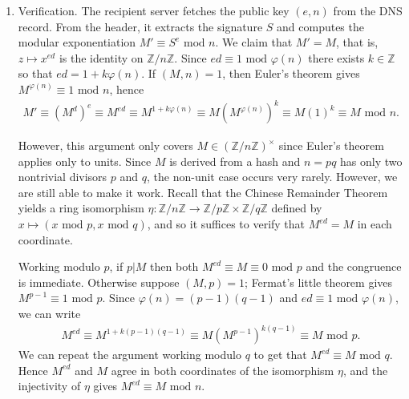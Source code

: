 \documentclass[12pt,reqno]{amsart}
\theoremstyle{definition}
\newcommand{\bbZ}{{\mathbb{Z}}}
\newcommand{\cM}{\mathcal{M}}
\renewcommand{\mod}{\text{ mod }}
\let\temp\phi
\let\phi\varphi
\let\varphi\temp
\begin{document}
\begin{enumerate}[label=\arabic*.]
    The multiplicative structure of $(\bbZ/n\bbZ)^\times$ has not been removed, rather the set of legitimately signable values is no longer closed under multiplication. A verifier checks that the recovered integer lies in $\cM$ (the leading digits match prescribed pattern), and rejects before the hash is even compared if not -- that is, products and blinded values fail this test immediately. 

    Now the server applies its private exponent $d$ to get $S\equiv M^d\mod n$, and records $S$ in the \verb|b=| field of the \texttt{DKIM-Signature} header. The body never entered the signed hash; it is bound to the signature only transitively, so integrity is enforced by two independent checks chained together rather than a single hash.
    \item Verification. The recipient server fetches the public key $(e,n)$ from the DNS record. From the header, it extracts the signature $S$ and computes the modular exponentiation $M'\equiv S^e\mod n$. We claim that $M'=M$, that is, $z\mapsto x^{ed}$ is the identity on $\bbZ/n\bbZ$. Since $ed\equiv 1\mod\phi(n)$ there exists $k\in \bbZ$ so that $ed=1+k\phi(n)$. If $(M,n)=1$, then Euler's theorem gives $M^{\phi(n)}\equiv 1\mod n$, hence
    \begin{align*}
        M'\equiv (M^d)^e\equiv M^{ed}\equiv M^{1+k\phi(n)}\equiv M(M^{\phi(n)})^k\equiv M(1)^k\equiv M\mod n.
    \end{align*} 
    
    However, this argument only covers $M\in(\bbZ/n\bbZ)^\times$ since Euler's theorem applies only to units. Since $M$ is derived from a hash and $n=pq$ has only two nontrivial divisors $p$ and $q$, the non-unit case occurs very rarely. However, we are still able to make it work. Recall that the Chinese Remainder Theorem yields a ring isomorphism $\eta:\bbZ/n\bbZ\to\bbZ/p\bbZ\times\bbZ/q\bbZ$ defined by $x\mapsto(x\mod p,x\mod q)$, and so it suffices to verify that $M^{ed}=M$ in each coordinate. 

    Working modulo $p$, if $p|M$ then both $M^{ed}\equiv M\equiv0\mod p$ and the congruence is immediate. Otherwise suppose $(M,p)=1$; Fermat's little theorem gives $M^{p-1}\equiv1\mod p$. Since $\phi(n)=(p-1)(q-1)$ and $ed\equiv1\mod\phi(n)$, we can write
    \begin{align*}
        M^{ed}\equiv M^{1+k(p-1)(q-1)}\equiv M(M^{p-1})^{k(q-1)}\equiv M\mod p.
    \end{align*} We can repeat the argument working modulo $q$ to get that $M^{ed}\equiv M\mod q$. Hence $M^{ed}$ and $M$ agree in both coordinates of the isomorphism $\eta$, and the injectivity of $\eta$ gives $M^{ed}\equiv M\mod n$.


\end{enumerate}
\end{document}
